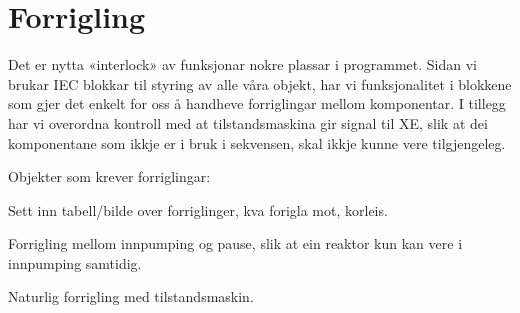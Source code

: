 \section{Forrigling}
\thispagestyle{fancy}

Det er nytta «interlock» av funksjonar nokre plassar i programmet. 
Sidan vi brukar IEC blokkar til styring av alle våra objekt, har vi funksjonalitet i blokkene som gjer det enkelt for oss å handheve forriglingar mellom komponentar. I tillegg har vi overordna kontroll med at tilstandsmaskina gir signal til XE, slik at dei komponentane som ikkje er i bruk i sekvensen, skal ikkje kunne vere tilgjengeleg.

Objekter som krever forriglingar:

Sett inn tabell/bilde over forriglinger, kva forigla mot, korleis.

Forrigling mellom innpumping og pause, slik at ein reaktor kun kan vere i innpumping samtidig.

Naturlig forrigling med tilstandsmaskin.
